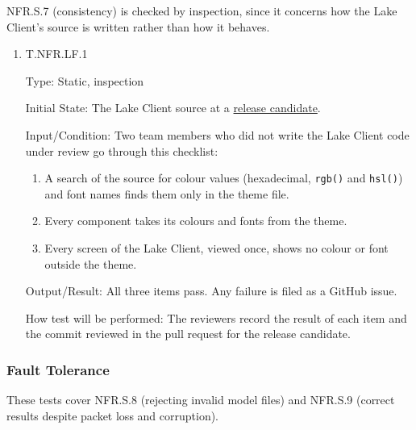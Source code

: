 \documentclass[12pt, titlepage]{article}
\providecommand{\glink}[2]{\hyperlink{gls:#1}{#2}}
\begin{document}
NFR.S.7 (consistency) is checked by inspection, since it concerns how the Lake
Client's source is written rather than how it behaves.

\begin{enumerate}

\item{T.NFR.LF.1\\}
\label{T.NFR.LF.1}

Type: Static, inspection

Initial State: The Lake Client source at a \glink{rc}{release candidate}.

Input/Condition: Two team members who did not write the Lake Client code under
review go through this checklist:
\begin{enumerate}
  \item A search of the source for colour values (hexadecimal, \texttt{rgb()}
    and \texttt{hsl()}) and font names finds them only in the theme file.
  \item Every component takes its colours and fonts from the theme.
  \item Every screen of the Lake Client, viewed once, shows no colour or font
    outside the theme.
\end{enumerate}

Output/Result: All three items pass. Any failure is filed as a GitHub issue.

How test will be performed: The reviewers record the result of each item and
the commit reviewed in the pull request for the release candidate.

\end{enumerate}

\subsubsection{Fault Tolerance}

These tests cover NFR.S.8 (rejecting invalid model files) and NFR.S.9 (correct
results despite packet loss and corruption).
\end{document}
